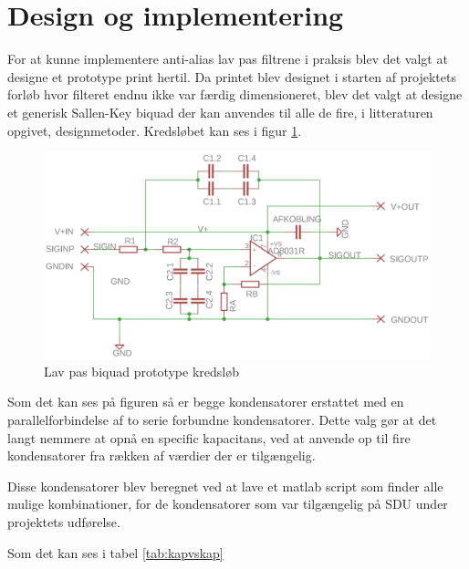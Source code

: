 \section{Design og implementering}\label{sec:filter_design}
For at kunne implementere anti-alias lav pas filtrene i praksis blev det valgt at designe et 
prototype print hertil. Da printet blev designet i starten af projektets forløb hvor filteret 
endnu ikke var færdig dimensioneret, blev det valgt at designe et generisk Sallen-Key biquad 
der kan anvendes til alle de fire, i litteraturen opgivet, designmetoder. Kredsløbet kan ses i 
figur \ref{fig:skbiquadsch}.



\begin{figure}[H]
	\includegraphics[width=\linewidth]{billeder/skbiquadsch}
	\caption{Lav pas biquad prototype kredsløb}
	\label{fig:skbiquadsch}
\end{figure}

Som det kan ses på figuren så er begge kondensatorer erstattet med en parallelforbindelse af 
to serie forbundne kondensatorer. Dette valg gør at det langt nemmere at opnå en specific 
kapacitans, ved at anvende op til fire kondensatorer fra rækken af værdier der er tilgængelig.

Disse kondensatorer blev beregnet ved at lave et matlab script som finder alle mulige kombinationer, for de kondensatorer som var tilgængelig på SDU under projektets udførelse.

Som det kan ses i tabel \ref{tab:kapvskap}

